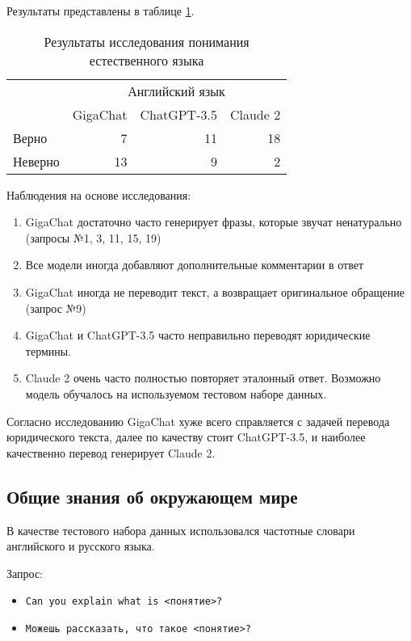 \documentclass{article}
\begin{document}
Результаты представлены в таблице \ref{tab:natural_language}.

\begin{table}[ht]
    \centering
    \begin{tabular}{lrrr}
        \toprule
                & \multicolumn{3}{c}{Английский язык}                          \\
        \cmidrule(r){2-4}
                & GigaChat                            & ChatGPT-3.5 & Claude 2 \\
        \midrule
        Верно   & 7                                   & 11          & 18       \\
        Неверно & 13                                  & 9           & 2        \\
        \bottomrule
    \end{tabular}
    \caption{Результаты исследования понимания естественного языка}
    \label{tab:natural_language}
\end{table}

Наблюдения на основе исследования:
\begin{enumerate}
    \item GigaChat достаточно часто генерирует фразы, которые звучат ненатурально (запросы №1, 3, 11, 15, 19)
    \item Все модели иногда добавляют дополнительные комментарии в ответ
    \item GigaChat иногда не переводит текст, а возвращает оригинальное обращение (запрос №9)
    \item GigaChat и ChatGPT-3.5 часто неправильно переводят юридические термины.
    \item Claude 2 очень часто полностью повторяет эталонный ответ. Возможно модель обучалось на используемом тестовом наборе данных.
\end{enumerate}

Согласно исследованию GigaChat хуже всего справляется с задачей перевода юридического текста, далее по качеству стоит ChatGPT-3.5, и наиболее качественно перевод генерирует Claude 2.

\subsection*{Общие знания об окружающем мире}

В качестве тестового набора данных использовался частотные словари английского \cite{davies2013frequency} и русского \cite{rus} языка.

Запрос:
\begin{itemize}
    \item \texttt{Can you explain what is <понятие>?}
    \item \texttt{Можешь рассказать, что такое <понятие>?}
\end{itemize}
\end{document}
